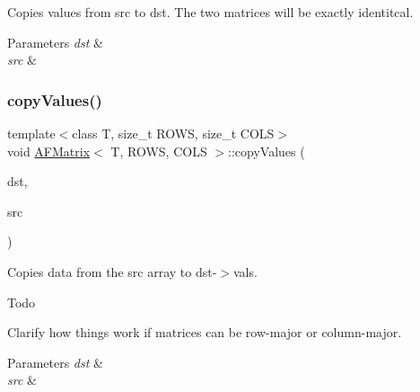 Copies values from {\ttfamily src} to {\ttfamily dst}. The two matrices will be exactly identitcal. 
\begin{DoxyParams}{Parameters}
{\em dst} & \\
\hline
{\em src} & \\
\hline
\end{DoxyParams}
\mbox{\label{class_a_f_matrix_ac655b95d85d38a72621381b5cf89df83}} 
\subsubsection{\texorpdfstring{copy\+Values()}{copyValues()}\hspace{0.1cm}{\footnotesize\ttfamily [2/3]}}
{\footnotesize\ttfamily template$<$class T, size\+\_\+t R\+O\+WS, size\+\_\+t C\+O\+LS$>$ \\
void \hyperlink{class_a_f_matrix}{A\+F\+Matrix}$<$ T, R\+O\+WS, C\+O\+LS $>$\+::copy\+Values (\begin{DoxyParamCaption}\item[{\hyperlink{class_a_f_matrix}{A\+F\+Matrix}$<$ T, R\+O\+WS, C\+O\+LS $>$ $\ast$}]{dst,  }\item[{array$<$ T, R\+O\+WS $\ast$C\+O\+LS $>$ $\ast$}]{src }\end{DoxyParamCaption})\hspace{0.3cm}{\ttfamily [inline]}}

Copies data from the {\ttfamily src} array to {\ttfamily dst-\/$>$vals}. \begin{DoxyRefDesc}{Todo}
\item[\hyperlink{todo__todo000004}{Todo}]Clarify how things work if matrices can be row-\/major or column-\/major. \end{DoxyRefDesc}

\begin{DoxyParams}{Parameters}
{\em dst} & \\
\hline
{\em src} & \\
\hline
\end{DoxyParams}
\mbox{\label{class_a_f_matrix_ac8930dd6d5ea5167fed5c768b96635f7}} 
